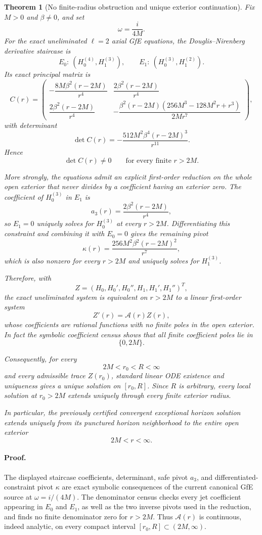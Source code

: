 \documentclass[11pt]{article}
\newtheorem{theorem}{Theorem}
\begin{document}
\begin{theorem}[No finite-radius obstruction and unique exterior continuation]
Fix $M>0$ and $\beta\neq0$, and set
\[
  \omega=\frac{i}{4M}.
\]
For the exact uneliminated $\ell=2$ axial GfE equations, the
Douglis--Nirenberg derivative staircase is
\[
  E_0:\ (H_0^{(4)},H_1^{(3)}),
  \qquad
  E_1:\ (H_0^{(3)},H_1^{(2)}).
\]
Its exact principal matrix is
\[
C(r)=
\begin{pmatrix}
-\dfrac{8M\beta^2(r-2M)}{r^4}
&
 \dfrac{2\beta^2(r-2M)}{r^4}
\\[7pt]
 \dfrac{2\beta^2(r-2M)}{r^4}
&
-\dfrac{\beta^2(r-2M)
(256M^3-128M^2r+r^3)}
{2Mr^7}
\end{pmatrix},
\]
with determinant
\[
  \det C(r)
  =
  -\frac{512M^2\beta^4(r-2M)^3}{r^{11}}.
\]
Hence
\[
  \det C(r)\neq0
  \qquad
  \text{for every finite }r>2M.
\]

More strongly, the equations admit an explicit first-order reduction
on the whole open exterior that never divides by a coefficient having
an exterior zero.  The coefficient of $H_0^{(3)}$ in $E_1$ is
\[
  a_3(r)
  =
  \frac{2\beta^2(r-2M)}{r^4},
\]
so $E_1=0$ uniquely solves for $H_0^{(3)}$ at every $r>2M$.
Differentiating this constraint and combining it with $E_0=0$ gives
the remaining pivot
\[
  \kappa(r)
  =
  \frac{256M^2\beta^2(r-2M)^2}{r^7},
\]
which is also nonzero for every $r>2M$ and uniquely solves for
$H_1^{(3)}$.

Therefore, with
\[
  Z=
  (H_0,H_0',H_0'',H_1,H_1',H_1'')^T,
\]
the exact uneliminated system is equivalent on $r>2M$ to a linear
first-order system
\[
  Z'(r)=\mathcal A(r)Z(r),
\]
whose coefficients are rational functions with no finite poles in the
open exterior.  In fact the symbolic coefficient census shows that
all finite coefficient poles lie in
\[
  \{0,2M\}.
\]

Consequently, for every
\[
  2M<r_0<R<\infty
\]
and every admissible trace $Z(r_0)$, standard linear ODE existence and
uniqueness gives a unique solution on $[r_0,R]$.  Since $R$ is
arbitrary, every local solution at $r_0>2M$ extends uniquely through
every finite exterior radius.

In particular, the previously certified convergent exceptional
horizon solution extends uniquely from its punctured horizon
neighborhood to the entire open exterior
\[
  2M<r<\infty .
\]
\end{theorem}

\paragraph{Proof.}
The displayed staircase coefficients, determinant, safe pivot
$a_3$, and differentiated-constraint pivot $\kappa$ are exact symbolic
consequences of the current canonical GfE source at
$\omega=i/(4M)$.  The denominator census checks every jet coefficient
appearing in $E_0$ and $E_1$, as well as the two inverse pivots used in
the reduction, and finds no finite denominator zero for $r>2M$.
Thus $\mathcal A(r)$ is continuous, indeed analytic, on every compact
interval $[r_0,R]\subset(2M,\infty)$.
\end{document}
